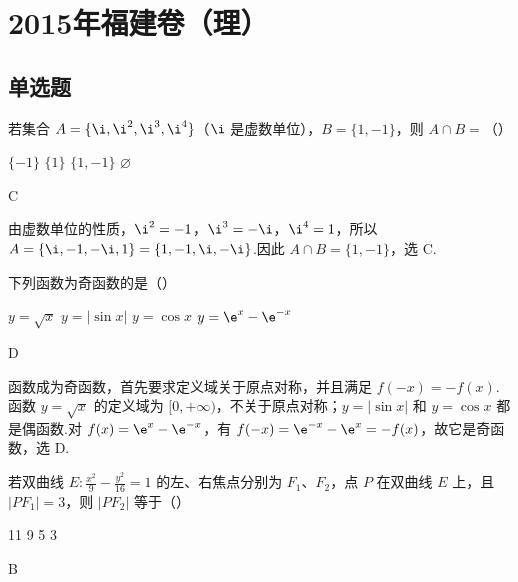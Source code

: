 \chapter{2015年福建卷（理）}

\section{单选题}

\begin{problem}
若集合 \(A = \{\i, \i^2, \i^3, \i^4\}\)（\(\i\) 是虚数单位），\(B = \{1, -1\}\)，则 \(A \cap B =\)（\quad）

\choices
    {\(\{-1\}\)}
    {\(\{1\}\)}
    {\(\{1, -1\}\)}
    {\(\varnothing\)}
\end{problem}

\begin{answer}
C
\end{answer}

\begin{solution}
由虚数单位的性质，\(\i^2=-1\)，\(\i^3=-\i\)，\(\i^4=1\)，所以
\(A=\{\i,-1,-\i,1\}=\{1,-1,\i,-\i\}\).因此 \(A\cap B=\{1,-1\}\)，选 C.
\end{solution}

\begin{problem}
下列函数为奇函数的是（\quad）

\choices
    {\( y = \sqrt{x} \)}
    {\( y = |\sin x| \)}
    {\( y = \cos x \)}
    {\( y = \e^{x} - \e^{-x} \)}
\end{problem}

\begin{answer}
D
\end{answer}

\begin{solution}
函数成为奇函数，首先要求定义域关于原点对称，并且满足 \(f(-x)=-f(x)\).函数 \(y=\sqrt{x}\) 的定义域为 \([0,+\infty)\)，不关于原点对称；\(y=|\sin x|\) 和 \(y=\cos x\) 都是偶函数.对 \(f(x)=\e^x-\e^{-x}\)，有
\(f(-x)=\e^{-x}-\e^x=-f(x)\)，故它是奇函数，选 D.
\end{solution}

\begin{problem}
若双曲线 \(E: \frac{x^2}{9} - \frac{y^2}{16} = 1\) 的左、右焦点分别为 \(F_1\)、\(F_2\)，点 \(P\) 在双曲线 \(E\) 上，且 \(|PF_1| = 3\)，则 \(|PF_2|\) 等于（\quad）

\choices
    {11}
    {9}
    {5}
    {3}
\end{problem}

\begin{answer}
B
\end{answer}

